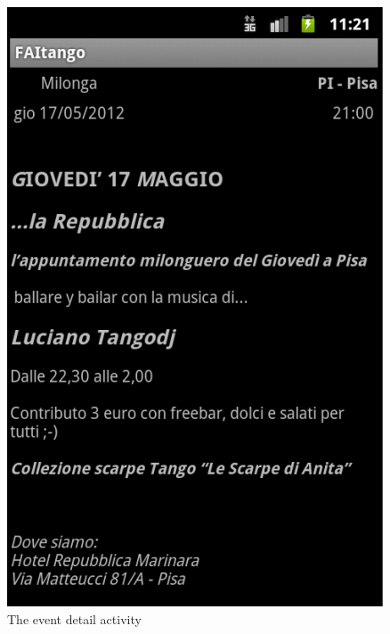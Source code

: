 \documentclass[12pt, twoside]{article}
\begin{document}
\begin{figure}[h]
\begin{center}
\includegraphics[scale=0.60]{fig/event-detail-up.png}
\end{center}
\caption{The event detail activity}
\label{fig:eventdetailup}
\end{figure}
\end{document}

